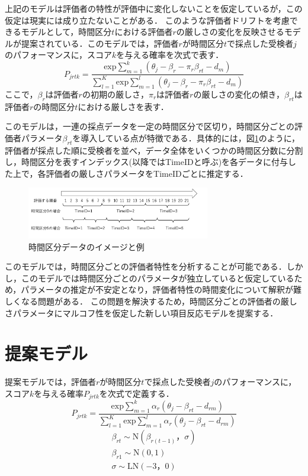 \documentclass[dvipdfmx, twocolumn, a4paper]{hcresume}
\begin{document}
上記のモデルは評価者の特性が評価中に変化しないことを仮定しているが，この仮定は現実には成り立たないことがある．
このような評価者ドリフトを考慮できるモデルとして，時間区分$t$における評価者$r$の厳しさの変化を反映させるモデルが提案されている\cite{Raudenbush}．このモデルでは，評価者$r$が時間区分$t$で採点した受検者$j$のパフォーマンスに，スコア$k$を与える確率を次式で表す．
\begin{displaymath}
  P_{jrtk}=\frac{\mathrm{exp}\sum_{m=1}^{k}(\theta_{j}-\beta_{r} - \pi_{r}\beta_{rt}-d_{m})}{\sum_{l=1}^{K}\mathrm{exp}\sum_{m=1}^{l}(\theta_{j}-\beta_{r} - \pi_{r}\beta_{rt}-d_{m})}
\end{displaymath}
ここで，$\beta_{r}$は評価者$r$の初期の厳しさ，$\pi_{r}$は評価者$r$の厳しさの変化の傾き，$\beta_{rt}$は評価者$r$の時間区分$t$における厳しさを表す．

このモデルは，一連の採点データを一定の時間区分で区切り，時間区分ごとの評価者パラメータ$\beta_{rt}$を導入している点が特徴である．具体的には，図\ref{timeid}のように，評価者が採点した順に受検者を並べ，データ全体をいくつかの時間区分数に分割し，時間区分を表すインデックス(以降ではTimeIDと呼ぶ)を各データに付与した上で，各評価者の厳しさパラメータをTimeIDごとに推定する．

\begin{figure}[t]
  \centering
  \includegraphics[width=8cm]{img/timeid.png}
  \caption{時間区分データのイメージと例}
  \label{timeid}
\end{figure}

このモデルでは，時間区分ごとの評価者特性を分析することが可能である．しかし，このモデルでは時間区分ごとのパラメータが独立していると仮定しているため，パラメータの推定が不安定となり，評価者特性の時間変化について解釈が難しくなる問題がある．
この問題を解決するため，時間区分ごとの評価者の厳しさパラメータにマルコフ性を仮定した新しい項目反応モデルを提案する．
\section{提案モデル}
提案モデルでは，評価者$r$が時間区分$t$で採点した受検者$j$のパフォーマンスに，スコア$k$を与える確率$P_{jrtk}$を次式で定義する．
\begin{displaymath}
  P_{jrtk}=\frac{\mathrm{exp}\sum^k_{m=1}{\alpha_r(\theta_{j}-\beta_{rt}-d_{rm})}}{\sum^K_{l=1} \mathrm{exp}\sum^l_{m=1}{\alpha_r(\theta_{j}-\beta_{rt}-d_{rm})}}
\end{displaymath}
\begin{eqnarray}
  \beta_{rt}\sim \mathrm{N}(\beta_{r(t-1)}，\sigma)\nonumber\\
  \beta_{r1} \sim \mathrm{N}(0,1)\nonumber\\
  \sigma \sim \mathrm{LN}(-3，0)\nonumber
\end{eqnarray}
\end{document}
